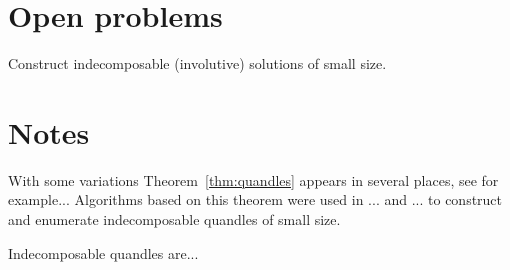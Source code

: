 \section*{Open problems}

\begin{problem}
Construct indecomposable (involutive) solutions of small size. 
\end{problem}

\section*{Notes}

With some variations Theorem~\ref{thm:quandles} appears in several places, 
see for example... Algorithms based on this theorem
were used in ... and ... to construct and enumerate indecomposable 
quandles of small size. 

Indecomposable quandles are...


